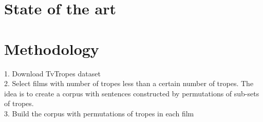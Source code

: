 \documentclass[letterpaper]{article}
\begin{document}
	
	
	
	
	
	
	\section{State of the art}
	
	\section{Methodology}
	
	1. Download TvTropes dataset \\
	2. Select films with number of tropes less than a certain number of tropes. The idea is to create a corpus with sentences constructed by permutations of sub-sets of tropes. \\
	3. Build the corpus with permutations of tropes in each film \\
\end{document}

